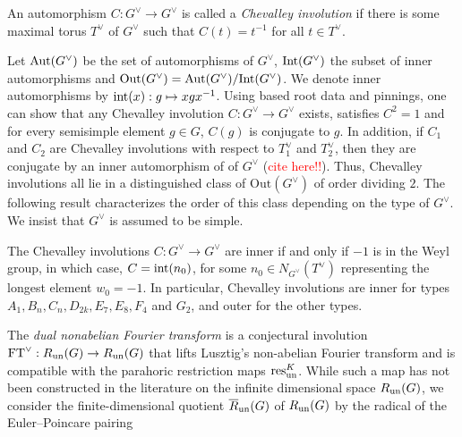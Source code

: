 \begin{definition}[\textcolor{red}{cite this better}]
    An automorphism $C:G^\vee\to G^\vee$ is called a \textit{Chevalley involution} if there is some maximal torus $T^\vee$ of $G^\vee$ such that $C(t)=t^{-1}$ for all $t\in T^\vee$.
\end{definition}
Let $\mathrm{Aut}(G^\vee)$ be the set of automorphisms of $G^\vee$, $\mathrm{Int}(G^\vee)$ the subset of inner automorphisms and $\mathrm{Out}(G^\vee)=\mathrm{Aut}(G^\vee)/\mathrm{Int}(G^\vee)$. We denote inner automorphisms by $\mathrm{int}(x):g\mapsto xgx^{-1}$. Using based root data and pinnings, one can show that any Chevalley involution $C:G^\vee\to G^\vee$ exists, satisfies $C^2=1$ and for every semisimple element $g\in G$, $C(g)$ is conjugate to $g$. In addition, if $C_1$ and $C_2$ are Chevalley involutions with respect to $T_1^\vee$ and $T_2^\vee$, then they are conjugate by an inner automorphism of of $G^\vee$ (\textcolor{red}{cite here!!}). Thus, Chevalley involutions all lie in a distinguished class of $\mathrm{Out}(G^\vee)$ of order dividing $2$. The following result characterizes the order of this class depending on the type of $G^\vee$. We insist that $G^\vee$ is assumed to be simple.

\begin{lemma}
    The Chevalley involutions $C:G^\vee\to G^\vee$ are inner if and only if $-1$ is in the Weyl group, in which case, $C=\mathrm{int}(n_0)$, for some $n_0\in N_{G^\vee}(T^\vee)$ representing the longest element $w_0=-1$. In particular, Chevalley involutions are inner for types $A_1,B_n,C_n,D_{2k},E_7,E_8,F_4$ and $G_2$, and outer for the other types.
\end{lemma}


The \textit{dual nonabelian Fourier transform} is a conjectural involution $\mathrm{FT}^\vee:R_{\mathrm{un}}(G)\to R_{\mathrm{un}}(G)$ that lifts Lusztig's non-abelian Fourier transform and is compatible with the parahoric restriction maps $\mathrm{res}^K_{\mathrm{un}}$. While such a map has not been constructed in the literature on the infinite dimensional space $R_{\mathrm{un}}(G)$, we consider the finite-dimensional quotient $\overline{R}_{\mathrm{un}}(G)$ of $R_{\mathrm{un}}(G)$ by the radical of the Euler--Poincare pairing

